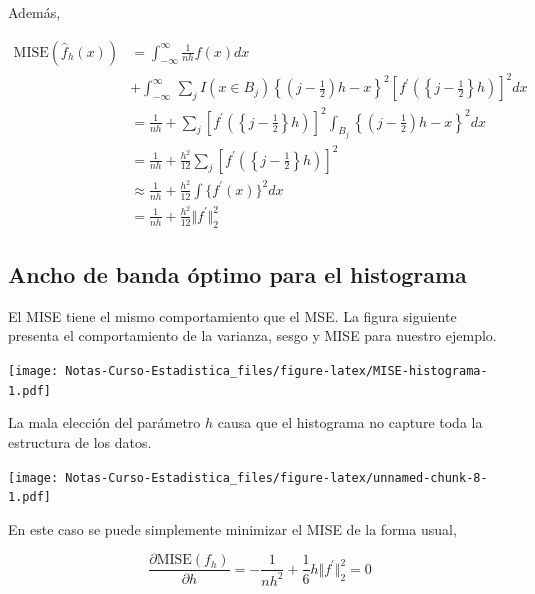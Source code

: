 \documentclass[
  12pt,
]{book}
\theoremstyle{definition}
\theoremstyle{definition}
\theoremstyle{definition}
\theoremstyle{remark}
\begin{document}
Además,

\begin{align*}
\mathrm{MISE} (\hat{f}_h(x))
& = \int_{ -\infty}^{\infty} \frac{1}{nh} f(x)dx                                                                                                                                          \\
& + \int_{ -\infty}^{\infty}\, \sum_{j}^{} I(x\in B_j) \left\{ \left( j- \frac{1}{2} \right)h -x  \right\}^2 \left [f^\prime \left( \left\{j - \frac{1}{2}\right\}h \right)  \right]^2 dx \\
& = \frac{1}{nh} + \sum_{j}^{} \left [f^\prime \left( \left\{j - \frac{1}{2}\right\}h \right)  \right]^2 \int_{ B_j}    \left\{ \left( j- \frac{1}{2} \right)h -x  \right\}^2 dx          \\
& =\frac{1}{nh} + \frac{h^2}{12} \sum_{j} \left [f^\prime \left( \left\{j - \frac{1}{2}\right\}h \right)  \right]^2                                                                       \\
& \approx \frac{1}{nh} + \frac{h^2}{12} \int \{f^\prime(x)\}^2 dx                                                                                                                         \\
& =\frac{1}{nh} + \frac{h^2}{12} \Vert f^\prime\Vert_{2}^2
\end{align*}

\hypertarget{ancho-de-banda-uxf3ptimo-para-el-histograma}{%
\subsection{Ancho de banda óptimo para el histograma}\label{ancho-de-banda-uxf3ptimo-para-el-histograma}}

El MISE tiene el mismo comportamiento que el MSE. La figura siguiente presenta el comportamiento de la varianza, sesgo y MISE para nuestro ejemplo.

\texttt{[image: Notas-Curso-Estadistica\_files/figure-latex/MISE-histograma-1.pdf]}

La mala elección del parámetro \(h\) causa que el histograma no capture toda la estructura de los datos.

\texttt{[image: Notas-Curso-Estadistica\_files/figure-latex/unnamed-chunk-8-1.pdf]}

En este caso se puede simplemente minimizar el MISE de la forma usual,

\begin{equation*}
\frac{\partial \mathrm{MISE}(f_{h})}{\partial h} = -\frac{1}{nh^2} + \frac{1}{6} h \Vert f^\prime\Vert_{2}^2 = 0
\end{equation*}
\end{document}
